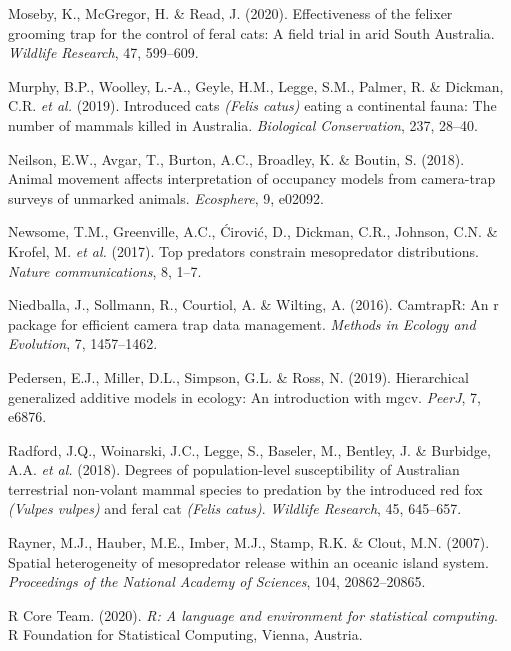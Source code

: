 \documentclass[11pt,a4paper,titlepage,twoside,openright]{style/unimelbthesis}
\begin{document}
\begin{mainmatter}
\leavevmode\hypertarget{ref-moseby2020effectiveness}{}%
Moseby, K., McGregor, H. \& Read, J. (2020). Effectiveness of the felixer grooming trap for the control of feral cats: A field trial in arid South Australia. \emph{Wildlife Research}, 47, 599--609.

\leavevmode\hypertarget{ref-murphy2019introduced}{}%
Murphy, B.P., Woolley, L.-A., Geyle, H.M., Legge, S.M., Palmer, R. \& Dickman, C.R. \emph{et al.} (2019). Introduced cats \emph{(Felis catus)} eating a continental fauna: The number of mammals killed in Australia. \emph{Biological Conservation}, 237, 28--40.

\leavevmode\hypertarget{ref-neilson2018animal}{}%
Neilson, E.W., Avgar, T., Burton, A.C., Broadley, K. \& Boutin, S. (2018). Animal movement affects interpretation of occupancy models from camera-trap surveys of unmarked animals. \emph{Ecosphere}, 9, e02092.

\leavevmode\hypertarget{ref-newsome2017top}{}%
Newsome, T.M., Greenville, A.C., Ćirović, D., Dickman, C.R., Johnson, C.N. \& Krofel, M. \emph{et al.} (2017). Top predators constrain mesopredator distributions. \emph{Nature communications}, 8, 1--7.

\leavevmode\hypertarget{ref-niedballa2016}{}%
Niedballa, J., Sollmann, R., Courtiol, A. \& Wilting, A. (2016). CamtrapR: An r package for efficient camera trap data management. \emph{Methods in Ecology and Evolution}, 7, 1457--1462.

\leavevmode\hypertarget{ref-pedersen2019hierarchical}{}%
Pedersen, E.J., Miller, D.L., Simpson, G.L. \& Ross, N. (2019). Hierarchical generalized additive models in ecology: An introduction with mgcv. \emph{PeerJ}, 7, e6876.

\leavevmode\hypertarget{ref-radford2018degrees}{}%
Radford, J.Q., Woinarski, J.C., Legge, S., Baseler, M., Bentley, J. \& Burbidge, A.A. \emph{et al.} (2018). Degrees of population-level susceptibility of Australian terrestrial non-volant mammal species to predation by the introduced red fox \emph{(Vulpes vulpes)} and feral cat \emph{(Felis catus)}. \emph{Wildlife Research}, 45, 645--657.

\leavevmode\hypertarget{ref-rayner2007spatial}{}%
Rayner, M.J., Hauber, M.E., Imber, M.J., Stamp, R.K. \& Clout, M.N. (2007). Spatial heterogeneity of mesopredator release within an oceanic island system. \emph{Proceedings of the National Academy of Sciences}, 104, 20862--20865.

\leavevmode\hypertarget{ref-R}{}%
R Core Team. (2020). \emph{R: A language and environment for statistical computing}. R Foundation for Statistical Computing, Vienna, Austria.


\end{mainmatter}
\end{document}
